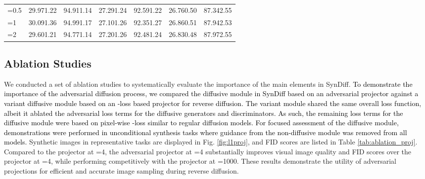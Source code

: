 \documentclass[journal,twoside,web]{ieeecolor}
\newcommand*{\revhl}{\textcolor{black}}
\begin{document}
\begin{table}[t]
{\begin{tabular}{lcccccc}
\multirow{1}{*}{=0.5}  & 29.971.22 & 94.911.14 & 27.291.24 & 92.591.22   &  26.760.50 & 87.342.55    \\
\multirow{1}{*}{=1}  & 30.091.36 & 94.991.17 & 27.101.26 & 92.351.27    &  26.860.51 & 87.942.53    \\
\multirow{1}{*}{=2}  & 29.601.21 & 94.771.14 & 27.201.26 & 92.481.24    &  26.830.48 & 87.972.55    \\\hline
\end{tabular}
}
\label{tab:ablation_param}
\end{table}


\subsection{Ablation Studies}
We conducted a set of ablation studies to systematically evaluate the importance of the main elements in SynDiff. \revhl{To demonstrate the importance of the adversarial diffusion process, we compared the diffusive module in SynDiff based on an adversarial projector against a variant diffusive module based on an -loss based projector for reverse diffusion. The variant module shared the same overall loss function, albeit it ablated the adversarial loss terms for the diffusive generators and discriminators. As such, the remaining loss terms for the diffusive module were based on pixel-wise -loss similar to regular diffusion models. For focused assessment of the diffusive module, demonstrations were performed in unconditional synthesis tasks where guidance from the non-diffusive module was removed from all models.} Synthetic images in representative tasks are displayed in Fig. \ref{fig:l1proj}, and FID scores are listed in Table \ref{tab:ablation_proj}. Compared to the  projector at =4, the adversarial projector at =4 substantially improves visual image quality and FID scores over the  projector at =4, while performing competitively with the  projector at =1000. These results demonstrate the utility of adversarial projections for efficient and accurate image sampling during reverse diffusion.    
\end{document}
